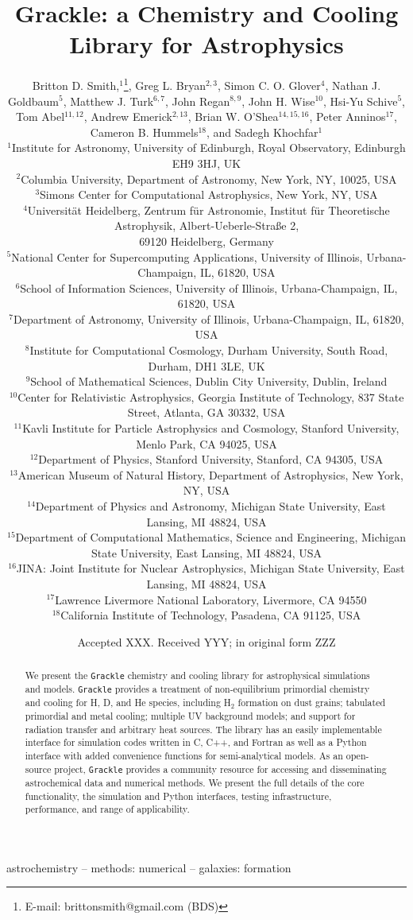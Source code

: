 \documentclass[a4paper,fleqn,usenatbib]{mnras}
\title[Grackle]{Grackle: a Chemistry and Cooling
  Library for Astrophysics}
\author[B.D. Smith et al.]
       {Britton D. Smith,$^{1}$\thanks{E-mail: brittonsmith@gmail.com
           (BDS)},
        Greg L. Bryan$^{2,3}$,
        Simon C. O. Glover$^{4}$,
        Nathan J. Goldbaum$^{5}$, \newauthor
        Matthew J. Turk$^{6,7}$,
        John Regan$^{8,9}$,
        John H. Wise$^{10}$,
        Hsi-Yu Schive$^{5}$,
        Tom Abel$^{11,12}$, \newauthor
        Andrew Emerick$^{2,13}$,
        Brian W. O'Shea$^{14,15,16}$,
        Peter Anninos$^{17}$, \newauthor
        Cameron B. Hummels$^{18}$,
        and Sadegh Khochfar$^{1}$\\
$^{1}$Institute for Astronomy, University of Edinburgh, Royal
Observatory, Edinburgh EH9 3HJ, UK\\
$^{2}$Columbia University, Department of Astronomy, New York, NY,
10025, USA\\
$^{3}$Simons Center for Computational Astrophysics, New York, NY,
USA\\
$^{4}$Universit\"{a}t Heidelberg, Zentrum f\"{u}r Astronomie, Institut
f\"{u}r Theoretische Astrophysik, Albert-Ueberle-Stra{\ss}e 2, \\69120
Heidelberg, Germany\\
$^{5}$National Center for Supercomputing Applications, University of
Illinois, Urbana-Champaign, IL, 61820, USA\\
$^{6}$School of Information Sciences, University of Illinois,
Urbana-Champaign, IL, 61820, USA\\
$^{7}$Department of Astronomy, University of Illinois,
Urbana-Champaign, IL, 61820, USA\\
$^{8}$Institute for Computational Cosmology, Durham University, South
Road, Durham, DH1 3LE, UK \\
$^{9}$School of Mathematical Sciences, Dublin City University, Dublin,
Ireland \\
$^{10}$Center for Relativistic Astrophysics, Georgia Institute of
Technology, 837 State Street, Atlanta, GA 30332, USA\\
$^{11}$Kavli Institute for Particle Astrophysics and Cosmology,
Stanford University, Menlo Park, CA 94025, USA\\
$^{12}$Department of Physics, Stanford University, Stanford, CA 94305,
USA\\
$^{13}$American Museum of Natural History, Department of Astrophysics,
New York, NY, USA\\
$^{14}$Department of Physics and Astronomy, Michigan State University,
East Lansing, MI 48824, USA\\
$^{15}$Department of Computational Mathematics, Science and
Engineering, Michigan State University, East Lansing, MI 48824, USA\\
$^{16}$JINA: Joint Institute for Nuclear Astrophysics, Michigan State
University, East Lansing, MI 48824, USA\\
$^{17}$Lawrence Livermore National Laboratory, Livermore, CA 94550\\
$^{18}$California Institute of Technology, Pasadena, CA 91125, USA\\
}
\date{Accepted XXX. Received YYY; in original form ZZZ}
\begin{document}
\label{firstpage}
\pagerange{\pageref{firstpage}--\pageref{lastpage}}
\maketitle

\begin{abstract}
We present the \texttt{Grackle} chemistry and cooling library for
astrophysical simulations and models.  \texttt{Grackle} provides
a treatment of non-equilibrium primordial chemistry and cooling for H, D, and He
species, including H$_{2}$ formation on dust grains; tabulated
primordial and metal cooling; multiple UV background models; and
support for radiation transfer and arbitrary heat sources.  The
library has an easily implementable interface for simulation codes
written in C, C++, and Fortran as well as a Python interface with
added convenience functions for semi-analytical models.  As an
open-source project, \texttt{Grackle} provides a community resource
for accessing and disseminating astrochemical data and numerical
methods.  We present the full details of the core functionality, the
simulation and Python interfaces, testing infrastructure, performance,
and range of applicability.
\end{abstract}

\begin{keywords}
astrochemistry -- methods: numerical -- galaxies: formation
\end{keywords}

















\footnotesize{
  
  
}

\bsp
\label{lastpage}
\end{document}
